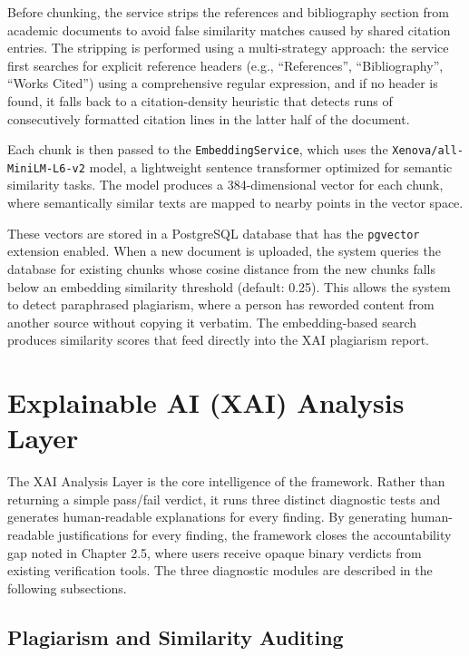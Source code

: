         Before chunking, the service strips the references and bibliography section from academic documents to avoid false similarity matches caused by shared citation entries. The stripping is performed using a multi-strategy approach: the service first searches for explicit reference headers (e.g., ``References'', ``Bibliography'', ``Works Cited'') using a comprehensive regular expression, and if no header is found, it falls back to a citation-density heuristic that detects runs of consecutively formatted citation lines in the latter half of the document.
        
        Each chunk is then passed to the \texttt{EmbeddingService}, which uses the \texttt{Xenova/all-MiniLM-L6-v2} model, a lightweight sentence transformer optimized for semantic similarity tasks. The model produces a 384-dimensional vector for each chunk, where semantically similar texts are mapped to nearby points in the vector space.
        
        These vectors are stored in a PostgreSQL database that has the \texttt{pgvector} extension enabled. When a new document is uploaded, the system queries the database for existing chunks whose cosine distance from the new chunks falls below an embedding similarity threshold (default: 0.25). This allows the system to detect paraphrased plagiarism, where a person has reworded content from another source without copying it verbatim. The embedding-based search produces similarity scores that feed directly into the XAI plagiarism report.


\section{Explainable AI (XAI) Analysis Layer}
\label{sec:Explainable AI}

The XAI Analysis Layer is the core intelligence of the framework. Rather than returning a simple pass/fail verdict, it runs three distinct diagnostic tests and generates human-readable explanations for every finding. By generating human-readable justifications for every finding, the framework closes the accountability gap noted in Chapter 2.5, where users receive opaque binary verdicts from existing verification tools. The three diagnostic modules are described in the following subsections.

    \subsection{Plagiarism and Similarity Auditing}

